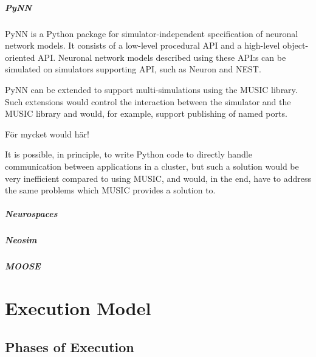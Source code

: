 \documentclass[a4paper]{report}
\newenvironment{metatext}%
{\color{blue}}%
{}
\begin{document}
\paragraph{PyNN}

PyNN is a Python package for simulator-independent specification of
neuronal network models.  It consists of a low-level procedural API
and a high-level object-oriented API.  Neuronal network models
described using these API:s can be simulated on simulators supporting
API, such as Neuron and NEST.

PyNN can be extended to support multi-simulations using the MUSIC
library.  Such extensions would control the interaction between the
simulator and the MUSIC library and would, for example, support
publishing of named ports.

\begin{metatext}
  För mycket would här!
\end{metatext}

It is possible, in principle, to write Python code to directly handle
communication between applications in a cluster, but such a solution
would be very inefficient compared to using MUSIC, and would, in the
end, have to address the same problems which MUSIC provides a solution
to.

\paragraph{Neurospaces}

\paragraph{Neosim}

\paragraph{MOOSE}

\chapter{Execution Model}

\section{Phases of Execution}
\end{document}
